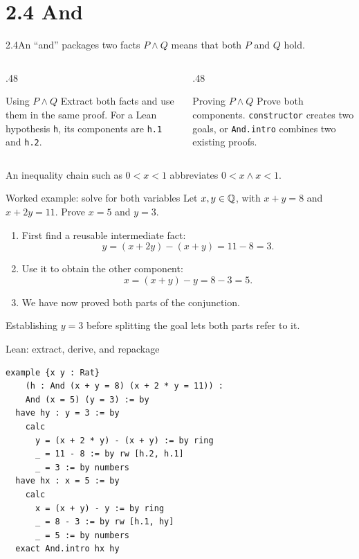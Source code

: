 \section{2.4 And}
\begin{frame}{2.4\quad An ``and'' packages two facts}
$P\land Q$ means that both $P$ and $Q$ hold.
\begin{columns}[T]
\begin{column}{.48\textwidth}
\begin{block}{Using $P\land Q$}
Extract both facts and use them in the same proof.
For a Lean hypothesis \texttt{h}, its components are \texttt{h.1} and \texttt{h.2}.
\end{block}
\end{column}
\begin{column}{.48\textwidth}
\begin{block}{Proving $P\land Q$}
Prove both components.
\texttt{constructor} creates two goals, or \texttt{And.intro} combines two existing proofs.
\end{block}
\end{column}
\end{columns}
\medskip
An inequality chain such as $0<x<1$ abbreviates $0<x\land x<1$.
\end{frame}

\begin{frame}{Worked example: solve for both variables}
Let $x,y\in\mathbb{Q}$, with $x+y=8$ and $x+2y=11$.
Prove $x=5$ and $y=3$.
\begin{enumerate}
\item First find a reusable intermediate fact:
\[
y=(x+2y)-(x+y)=11-8=3.
\]
\item Use it to obtain the other component:
\[
x=(x+y)-y=8-3=5.
\]
\item We have now proved both parts of the conjunction.
\end{enumerate}
Establishing $y=3$ before splitting the goal lets both parts refer to it.
\end{frame}

\begin{frame}[fragile]{Lean: extract, derive, and repackage}
\begin{lstlisting}
example {x y : Rat}
    (h : And (x + y = 8) (x + 2 * y = 11)) :
    And (x = 5) (y = 3) := by
  have hy : y = 3 := by
    calc
      y = (x + 2 * y) - (x + y) := by ring
      _ = 11 - 8 := by rw [h.2, h.1]
      _ = 3 := by numbers
  have hx : x = 5 := by
    calc
      x = (x + y) - y := by ring
      _ = 8 - 3 := by rw [h.1, hy]
      _ = 5 := by numbers
  exact And.intro hx hy
\end{lstlisting}
\end{frame}


